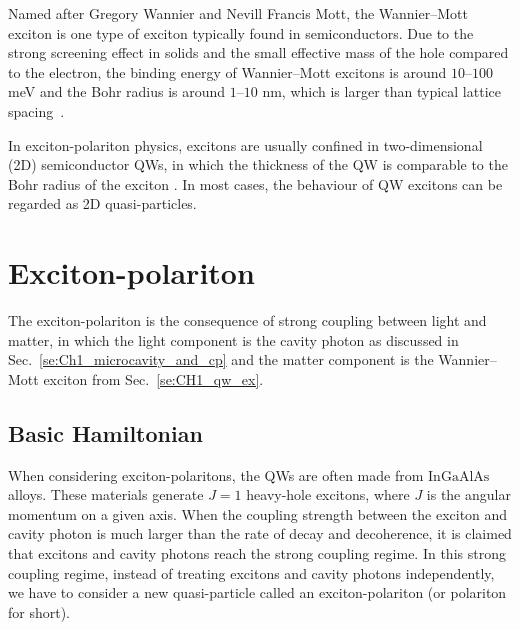 Named after Gregory Wannier and Nevill Francis Mott, the Wannier--Mott exciton is one type of exciton typically found in semiconductors.
Due to the strong screening effect in solids and the small effective mass of the hole compared to the electron, the binding energy of Wannier--Mott excitons is around $10$--$100$ meV and the Bohr radius is around $1$--$10$ nm, which is larger than typical lattice spacing~\cite{Hanamura:1977aa}.

In exciton-polariton physics, excitons are usually confined in two-dimensional (2D) semiconductor QWs, in which the thickness of the QW is comparable to the Bohr radius of the exciton .
In most cases, the behaviour of QW excitons can be regarded as 2D quasi-particles.

\section{Exciton-polariton} \label{se:CH1_ex_pl}
The exciton-polariton is the consequence of strong coupling between light and matter, in which the light component is the cavity photon as discussed in Sec.~\ref{se:Ch1_microcavity_and_cp} and the matter component is the Wannier--Mott exciton from Sec.~\ref{se:CH1_qw_ex}.

\subsection{Basic Hamiltonian}
When considering exciton-polaritons, the QWs are often made from $\mathrm{InGaAlAs}$ alloys.
These materials generate $J=1$ heavy-hole excitons, where $J$ is the angular momentum on a given axis.
When the coupling strength between the exciton and cavity photon is much larger than the rate of decay and decoherence, it is claimed that excitons and cavity photons reach the strong coupling regime.
In this strong coupling regime, instead of treating excitons and cavity photons independently, we have to consider a new quasi-particle called an exciton-polariton (or polariton for short).

